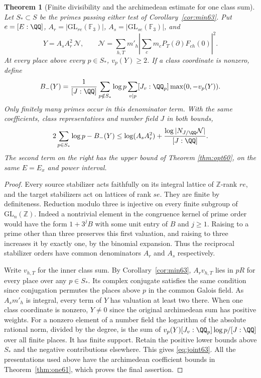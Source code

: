 \documentclass[a4paper,11pt]{article}
\newtheorem{theorem}[proposition]{Theorem}
\theoremstyle{definition}
\theoremstyle{remark}
\newcommand{\ZZ}{\mathbb Z}\newcommand{\ord}{\operatorname{ord}}
\numberwithin{equation}{section}
\begin{document}
\begin{theorem}[Finite divisibility and the archimedean estimate for one class sum]\label{thm:joint63}
Let \(S_*\subset S\) be the primes passing either test of
Corollary~\ref{cor:min63}. Put \(e=[E:\QQ]\),
\(A_r=|\mathrm{GL}_{re}(\mathbb F_3)|\),
\(A_s=|\mathrm{GL}_{se}(\mathbb F_3)|\), and
\[
        Y=A_sA_r^2\,\mathcal N,\qquad
        \mathcal N=\sum_{h,T}m'_h
           \left|\sum_c m_c P_T(\partial)F_{ch}(0)\right|^2 .
\]
At every place above every \(p\in S_*\), \(v_p(Y)\ge2\).
If a class coordinate is nonzero, define
\[
  B_-(Y)=\frac1{[J:\QQ]}
    \sum_{p\notin S_*}\log p\sum_{v\mid p}[J_v:\QQ_p]
                                            \max(0,-v_p(Y)).
\]
Only finitely many primes occur in this denominator term. With the
same coefficients, class representatives and number field \(J\)
in both bounds,
\begin{equation}
 2\sum_{p\in S_*}\log p-B_-(Y)
     \le \log(A_s A_r^2)+\frac{\log|N_{J/\QQ}\mathcal N|}{[J:\QQ]} .
                                                      \label{eq:joint63}
\end{equation}
The second term on the right has the upper bound of Theorem \ref{thm:opt60}, on the same \(E=E_x\) and power interval.
\end{theorem}
\begin{proof}
Every source stabilizer acts faithfully on its integral lattice
of \(\ZZ\)-rank \(re\), and the target stabilizers act on lattices
of rank \(se\). They are finite by definiteness. Reduction modulo
three is injective on every finite subgroup of
\(\mathrm{GL}_n(\ZZ)\). Indeed a nontrivial element in the
congruence kernel of prime order would have the form \(1+3^jB\)
with some unit entry of \(B\) and \(j\ge1\). Raising to a prime
other than three preserves this first valuation, and raising
to three increases it by exactly one, by the binomial expansion.
Thus the reciprocal stabilizer orders have common denominators
\(A_r\) and \(A_s\) respectively.

Write \(v_{h,T}\) for the inner class sum. By
Corollary~\ref{cor:min63}, \(A_r v_{h,T}\) lies in \(pR\)
for every place over any \(p\in S_*\). Its complex conjugate
satisfies the same condition since conjugation permutes the
places above \(p\) in the common Galois field. As \(A_sm'_h\)
is integral, every term of \(Y\) has valuation at least two
there. When one class coordinate is nonzero, \(Y\ne0\) since
the original archimedean sum has positive weights.
For a nonzero element of a number field the logarithm of the
absolute rational norm, divided by the degree, is the sum of
\(v_p(Y)[J_v:\QQ_p]\log p/[J:\QQ]\) over all finite places.
It has finite support. Retain the positive lower bounds above
\(S_*\) and the negative contributions elsewhere. This gives
\eqref{eq:joint63}. All the presentations used above have the
archimedean coefficient bounds in Theorem~\ref{thm:one61}, which
proves the final assertion.
\end{proof}
\end{document}
